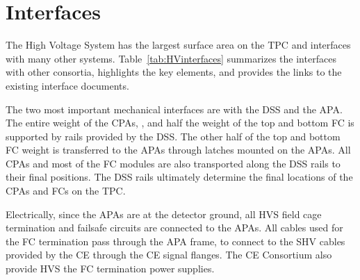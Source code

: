 \section{Interfaces }
\label{sec:fdsp-hv-intfc}




The High Voltage System has the largest surface area on the TPC and interfaces with many other systems.  Table~\ref{tab:HVinterfaces} summarizes the interfaces with other consortia, highlights the key elements, and provides the links to the existing interface documents.

The two most important mechanical interfaces are with the DSS and the APA.  The entire weight of the CPAs, ,  and half the weight of the top and bottom FC is supported by rails provided by the DSS.  The other half of the top and bottom FC weight is transferred to the APAs through latches mounted on the APAs. All CPAs and most of the FC modules are also transported along the DSS rails to their final positions. The DSS rails ultimately determine the final locations of the CPAs and FCs on the TPC.

Electrically, since the APAs are at the detector ground, all HVS field cage termination and failsafe circuits are connected to the APAs.  All cables used for the FC termination pass through the APA frame, to connect to the SHV cables provided by the CE through the CE signal flanges.  The CE Consortium also provide HVS the FC termination power supplies.




